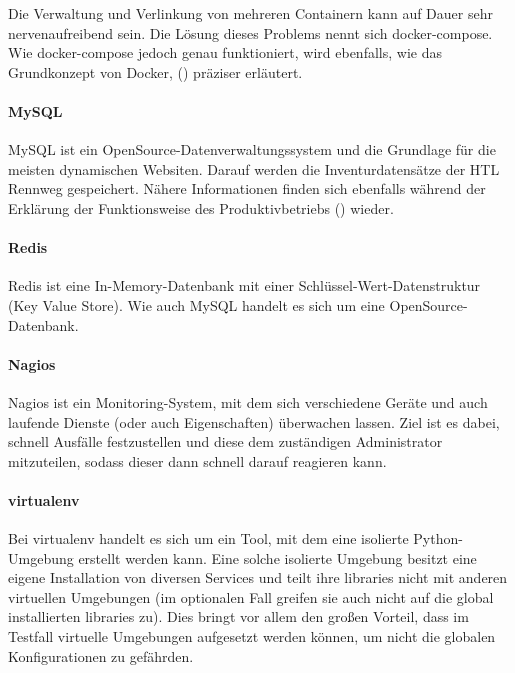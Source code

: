 \documentclass[
]{article}
\begin{document}
Die Verwaltung und Verlinkung von mehreren Containern kann auf Dauer
sehr nervenaufreibend sein. Die Lösung dieses Problems nennt sich
docker-compose. Wie docker-compose jedoch genau funktioniert, wird
ebenfalls, wie das Grundkonzept von Docker,
() präziser erläutert.

\hypertarget{mysql}{%
\paragraph{MySQL}\label{mysql}}

MySQL ist ein OpenSource-Datenverwaltungssystem und die Grundlage für
die meisten dynamischen Websiten. Darauf werden die Inventurdatensätze
der HTL Rennweg gespeichert. Nähere Informationen finden sich ebenfalls
während der Erklärung der Funktionsweise des Produktivbetriebs
() wieder.

\hypertarget{redis}{%
\paragraph{Redis}\label{redis}}

Redis ist eine In-Memory-Datenbank mit einer
Schlüssel-Wert-Datenstruktur (Key Value Store). Wie auch MySQL handelt
es sich um eine OpenSource-Datenbank.

\hypertarget{nagios}{%
\paragraph{Nagios}\label{nagios}}

Nagios ist ein Monitoring-System, mit dem sich verschiedene Geräte und
auch laufende Dienste (oder auch Eigenschaften) überwachen lassen. Ziel
ist es dabei, schnell Ausfälle festzustellen und diese dem zuständigen
Administrator mitzuteilen, sodass dieser dann schnell darauf reagieren
kann.

\hypertarget{virtualenv}{%
\paragraph{virtualenv}\label{virtualenv}}

Bei virtualenv handelt es sich um ein Tool, mit dem eine isolierte
Python-Umgebung erstellt werden kann. Eine solche isolierte Umgebung
besitzt eine eigene Installation von diversen Services und teilt ihre
libraries nicht mit anderen virtuellen Umgebungen (im optionalen Fall
greifen sie auch nicht auf die global installierten libraries zu). Dies
bringt vor allem den großen Vorteil, dass im Testfall virtuelle
Umgebungen aufgesetzt werden können, um nicht die globalen
Konfigurationen zu gefährden.
\end{document}
